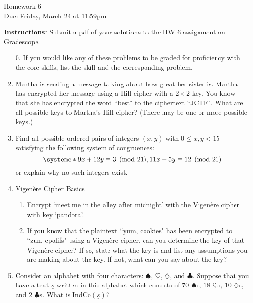 \documentclass[12pt]{article}
\begin{document}
\begin{center}
{\Large Homework 6}\\
Due: Friday,  March 24 at 11:59pm\\


\end{center}
{\bf Instructions:} Submit a pdf of your solutions to the HW 6 assignment on Gradescope.  



\begin{enumerate}
\item[0.] If you would like any of these problems to be graded for proficiency with the core skills, list the skill and the corresponding problem. 

\item Martha is sending a message talking about how great her sister is.  Martha has encrypted her message using a Hill cipher with a $2\times 2$ key.  You know that she has encrypted the word ``best" to the ciphertext ``JCTF".  What are all possible keys to Martha's Hill cipher? (There may be one or more possible keys.)

\item Find all possible ordered pairs of integers $(x,y)$ with $0\le x,y<15$ satisfying the following system of congruences:
$$\systeme*{9x+12y\equiv 3\pmod{21}, 11x+5y\equiv 12\pmod{21}}$$ or explain why no such integers exist. 

\item Vigen\`{e}re Cipher Basics
\begin{enumerate}
\item Encrypt `meet me in the alley after midnight' with the Vigen\`{e}re cipher with key `pandora'.
\item If you know that the plaintext ``yum, cookies" has been encrypted to ``zun, cpolifs" using a Vigen\`{e}re cipher, can you determine the key of that Vigen\`{e}re cipher? If so, state what the key is and list any assumptions you are making about the key. If not, what can you say about the key? 
\end{enumerate}

\item Consider an alphabet with four characters: $\spadesuit$, $\heartsuit$, $\diamondsuit$, and $\clubsuit$.  Suppose that you have a text $\underline{s}$ written in this alphabet which consists of $70$ $\spadesuit$s,  $18$ $\heartsuit$s, $10$ $\diamondsuit$s, and $2$ $\clubsuit$s.  What is $\textrm{IndCo}(\underline{s})$?


\end{enumerate}
\end{document}
